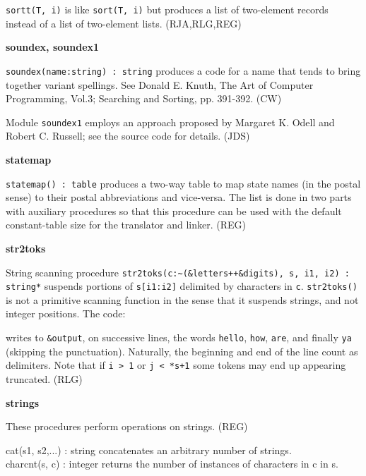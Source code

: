 \texttt{sortt}\texttt{(T, i)} is like \texttt{sort(T, i)}
but produces a list of two-element records instead of a list of
two-element lists. (RJA,RLG,REG)

{\sffamily\bfseries
{}soundex, soundex1}

\texttt{soundex(name:string) : string} produces a code for a name that
tends to bring together variant spellings. See Donald E. Knuth, The Art
of Computer Programming, Vol.3; Searching and Sorting, pp. 391-392.
(CW)

Module \texttt{soundex1} employs an approach proposed by Margaret K.
Odell and Robert C. Russell; see the source code for details. (JDS)

{\sffamily\bfseries
statemap}

\texttt{statemap() : table} produces a
{\textquotedbl}two-way{\textquotedbl} table to map state names (in the postal sense) to their postal abbreviations
and vice-versa. The list is done in two parts with auxiliary procedures
so that this procedure can be used with the default constant-table size
for the translator and linker. (REG)

{\sffamily\bfseries
str2toks}

String scanning procedure \texttt{str2toks(c:\~{}(\&letters++\&digits),
s, i1, i2) : string*} suspends portions of \texttt{s[i1:i2]} delimited
by characters in \texttt{c}. \texttt{str2toks()} is not a primitive
scanning function in the sense that it suspends strings, and not
integer positions. The code:


writes to \texttt{\&output}, on successive lines, the words
\texttt{{\textquotedbl}hello{\textquotedbl}},
\texttt{{\textquotedbl}how{\textquotedbl}},
\texttt{{\textquotedbl}are{\textquotedbl}}, and finally
\texttt{{\textquotedbl}ya{\textquotedbl}} (skipping the punctuation).
Naturally, the beginning and end of the line count as delimiters. Note
that if \texttt{i {\textgreater} 1} or \texttt{j {\textless} *s+1} some
tokens may end up appearing truncated. (RLG)

{\sffamily\bfseries
strings}

These procedures perform operations on strings. (REG)

\textsf{cat(s1, s2,...) : string} concatenates an arbitrary number of
strings.\\
\textsf{charcnt(s, c) : integer} returns the number of instances of
characters in c in s.

